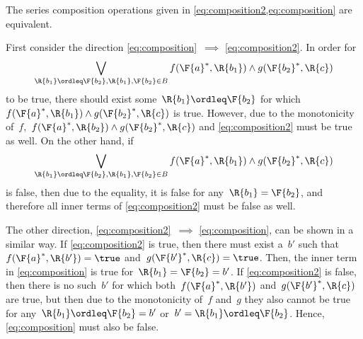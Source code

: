 \begin{remark}
  \label{lem:composition_equivalency}
  The series composition operations given in \cref{eq:composition2,eq:composition} are equivalent.


  First consider the direction \cref{eq:composition}~$\implies$ \cref{eq:composition2}. In order for%
  \begin{equation*}
    \bigvee_{\R{b_1}\ordleq\F{b_2}, \R{b_1},\F{b_2}\in B} f(\F{a}^*,\R{b_1}) \wedge g(\F{b_2}^*,\R{c})%
  \end{equation*}
  to be true, there should exist some~$\R{b_1}\ordleq \F{b_2}$ for which~$f(\F{a}^*,\R{b_1}) \wedge g(\F{b_2}^*,\R{c})$ is true. However, due to the monotonicity of~$f$,~$f(\F{a}^*,\R{b_2}) \wedge g(\F{b_2}^*,\R{c})$ and \cref{eq:composition2} must be true as well. On the other hand, if%
  \begin{equation*}
    \bigvee_{\R{b_1}\ordleq\F{b_2}, \R{b_1},\F{b_2}\in B} f(\F{a}^*,\R{b_1}) \wedge g(\F{b_2}^*,\R{c})%
  \end{equation*}
  is false, then due to the equality, it is false for any~$\R{b_1}=\F{b_2}$, and therefore all inner terms of \cref{eq:composition2} must be false as well.

  The other direction, \cref{eq:composition2}~$\implies$ \cref{eq:composition}, can be shown in a similar way. If \cref{eq:composition2} is true, then there must exist a~$b'$ such that~$f(\F{a}^*, \R{b'})=\true$ and~$g(\F{b'}^*, \R{c})=\true$. Then, the inner term in \cref{eq:composition} is true for~$\R{b_1}=\F{b_2}=b'$. If \cref{eq:composition2} is false, then there is no such~$b'$ for which both~$f(\F{a}^*, \R{b'})$ and~$g(\F{b'}^*, \R{c})$ are true, but then due to the monotonicity of~$f$ and~$g$ they also cannot be true for any~$\R{b_1} \ordleq \F{b_2} = b'$ or~$b'=\R{b_1} \ordleq \F{b_2}$. Hence, \cref{eq:composition} must also be false.
\end{remark}
